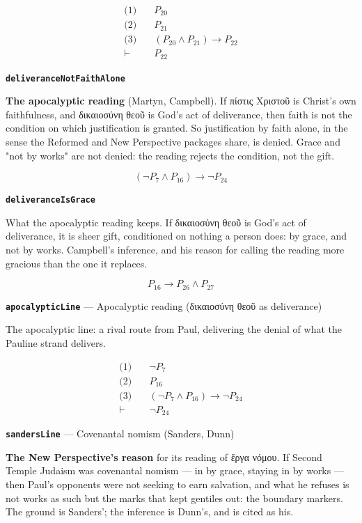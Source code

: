 \documentclass[11pt]{article}
\begin{document}
\begin{align*}
  \text{(1)} \quad & P_{20} \\
  \text{(2)} \quad & P_{21} \\
  \text{(3)} \quad & (P_{20} \land P_{21}) \rightarrow P_{22} \\
  \vdash \quad & P_{22}
\end{align*}
\par\medskip\noindent\textbf{\texttt{deliverance\allowbreak{}Not\allowbreak{}Faith\allowbreak{}Alone}}\par\nobreak\noindent
\textbf{The apocalyptic reading} (Martyn, Campbell). If πίστις Χριστοῦ is Christ's own faithfulness, and δικαιοσύνη θεοῦ is God's act of deliverance, then faith is not the condition on which justification is granted. So justification by faith alone, in the sense the Reformed and New Perspective packages share, is denied. Grace and "not by works" are not denied: the reading rejects the condition, not the gift.

\[(\lnot P_{7} \land P_{16}) \rightarrow \lnot P_{24}\]
\par\medskip\noindent\textbf{\texttt{deliverance\allowbreak{}Is\allowbreak{}Grace}}\par\nobreak\noindent
What the apocalyptic reading keeps. If δικαιοσύνη θεοῦ is God's act of deliverance, it is sheer gift, conditioned on nothing a person does: by grace, and not by works. Campbell's inference, and his reason for calling the reading more gracious than the one it replaces.

\[P_{16} \rightarrow P_{26} \land P_{27}\]
\par\medskip\noindent\textbf{\texttt{apocalyptic\allowbreak{}Line}} --- Apocalyptic reading (δικαιοσύνη θεοῦ as deliverance)\par\nobreak\noindent
The apocalyptic line: a rival route from Paul, delivering the denial of what the Pauline strand delivers.

\begin{align*}
  \text{(1)} \quad & \lnot P_{7} \\
  \text{(2)} \quad & P_{16} \\
  \text{(3)} \quad & (\lnot P_{7} \land P_{16}) \rightarrow \lnot P_{24} \\
  \vdash \quad & \lnot P_{24}
\end{align*}
\par\medskip\noindent\textbf{\texttt{sanders\allowbreak{}Line}} --- Covenantal nomism (Sanders, Dunn)\par\nobreak\noindent
\textbf{The New Perspective's reason} for its reading of ἔργα νόμου. If Second Temple Judaism was covenantal nomism — in by grace, staying in by works — then Paul's opponents were not seeking to earn salvation, and what he refuses is not works as such but the marks that kept gentiles out: the boundary markers. The ground is Sanders'; the inference is Dunn's, and is cited as his.
\end{document}
